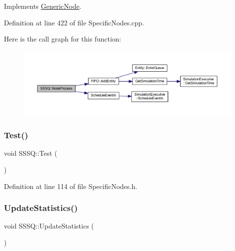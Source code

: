 Implements \hyperlink{class_generic_node_ae942258a57f211072d179da470579add}{Generic\+Node}.



Definition at line 422 of file Specific\+Nodes.\+cpp.

Here is the call graph for this function\+:
\nopagebreak
\begin{figure}[H]
\begin{center}
\leavevmode
\includegraphics[width=350pt]{class_s_s_s_q_a21ff1a4817052985747b6df51bf5d643_cgraph}
\end{center}
\end{figure}
\mbox{\label{class_s_s_s_q_aad6abb8c7afcca47a7b567f9adfbf032}} 
\subsubsection{\texorpdfstring{Test()}{Test()}}
{\footnotesize\ttfamily void S\+S\+S\+Q\+::\+Test (\begin{DoxyParamCaption}{ }\end{DoxyParamCaption})\hspace{0.3cm}{\ttfamily [inline]}}



Definition at line 114 of file Specific\+Nodes.\+h.

\mbox{\label{class_s_s_s_q_a8d3666772548e12aa39484d22ab5635c}} 
\subsubsection{\texorpdfstring{Update\+Statistics()}{UpdateStatistics()}}
{\footnotesize\ttfamily void S\+S\+S\+Q\+::\+Update\+Statistics (\begin{DoxyParamCaption}{ }\end{DoxyParamCaption})}



